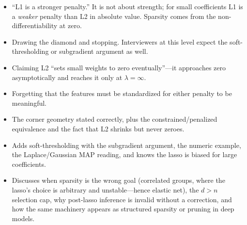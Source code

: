 \begin{interviewq}
\redflags
\begin{itemize}
    \item ``L1 is a stronger penalty.'' It is not about strength; for small coefficients L1 is a \emph{weaker} penalty than L2 in absolute value. Sparsity comes from the non-differentiability at zero.
    \item Drawing the diamond and stopping. Interviewers at this level expect the soft-thresholding or subgradient argument as well.
    \item Claiming L2 ``sets small weights to zero eventually''---it approaches zero asymptotically and reaches it only at $\lambda=\infty$.
    \item Forgetting that the features must be standardized for either penalty to be meaningful.
\end{itemize}


\goodgreat
\begin{itemize}
    \item {} The corner geometry stated correctly, plus the constrained/penalized equivalence and the fact that L2 shrinks but never zeroes.
    \item {} Adds soft-thresholding with the subgradient argument, the numeric example, the Laplace/Gaussian MAP reading, and knows the lasso is biased for large coefficients.
    \item {} Discusses when sparsity is the wrong goal (correlated groups, where the lasso's choice is arbitrary and unstable---hence elastic net), the $d>n$ selection cap, why post-lasso inference is invalid without a correction, and how the same machinery appears as structured sparsity or pruning in deep models.
\end{itemize}

\end{interviewq}


